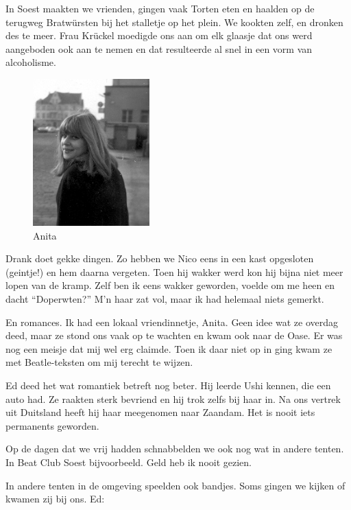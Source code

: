 \documentclass[12pt,twoside, openright]{memoir}
\begin{document}
In Soest maakten we vrienden, gingen vaak Torten eten en haalden op de terugweg Bratwürsten bij het stalletje op het plein. We kookten zelf, en dronken des te meer. Frau Krückel moedigde ons aan om elk glaasje dat ons werd aangeboden ook aan te nemen en dat resulteerde al snel in een vorm van alcoholisme. 
\begin{figure}
\begin{center}
\includegraphics[width=0.40\textwidth]{img/165Soest1}
\caption*{\footnotesize Anita}
\end{center}
\end{figure}
Drank doet gekke dingen. Zo hebben we Nico eens in een kast opgesloten (geintje!) en hem daarna vergeten. Toen hij wakker werd kon hij bijna niet meer lopen van de kramp. Zelf ben ik eens wakker geworden, voelde om me heen en dacht ``Doperwten?'' M’n haar zat vol, maar ik had helemaal niets gemerkt. 

En romances. Ik had een lokaal vriendinnetje, Anita. Geen idee wat ze overdag deed, maar ze stond ons vaak op te wachten en kwam ook naar de Oase. Er was nog een meisje dat mij wel erg claimde. Toen ik daar niet op in ging kwam ze met Beatle-teksten om mij terecht te wijzen. 

Ed deed het wat romantiek betreft nog beter. Hij leerde Ushi kennen, die een auto had. Ze raakten sterk bevriend en hij trok zelfs bij haar in. Na ons vertrek uit Duitsland heeft hij haar meegenomen naar Zaandam. Het is nooit iets permanents geworden.

Op de dagen dat we vrij hadden schnabbelden we ook nog wat in andere tenten. In Beat Club Soest bijvoorbeeld. Geld heb ik nooit gezien. 

In andere tenten in de omgeving speelden ook bandjes. Soms gingen we kijken of kwamen zij bij ons. Ed:
\end{document}
